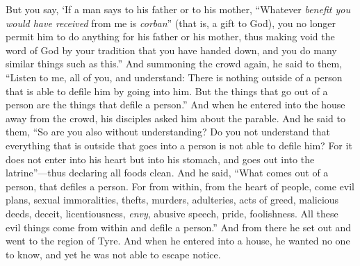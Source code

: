 \begin{biblechapter}
\verse But you say, ‘If a man says to his father or to his mother, “Whatever \textit{benefit you would have received} from me is \textit{corban}” (that is, a gift to God),
\verse you no longer permit him to do anything for his father or his mother,
\verse thus making void the word of God by your tradition that you have handed down, and you do many similar things such as this.”
 And summoning the crowd again, he said to them, “Listen to me, all of you, and understand:
\verse There is nothing outside of a person that is able to defile him by going into him. But the things that go out of a person are the things that defile a person.”
\verse And when he entered into the house away from the crowd, his disciples asked him about the parable.
\verse And he said to them, “So are you also without understanding? Do you not understand that everything that is outside that goes into a person is not able to defile him?
\verse For it does not enter into his heart but into his stomach, and goes out into the latrine”—thus declaring all foods clean.
\verse And he said, “What comes out of a person, that defiles a person.
\verse For from within, from the heart of people, come evil plans, sexual immoralities, thefts, murders,
\verse adulteries, acts of greed, malicious deeds, deceit, licentiousness, \textit{envy}, abusive speech, pride, foolishness.
\verse All these evil things come from within and defile a person.”
 And from there he set out and went to the region of Tyre. And when he entered into a house, he wanted no one to know, and yet he was not able to escape notice.

\end{biblechapter}
